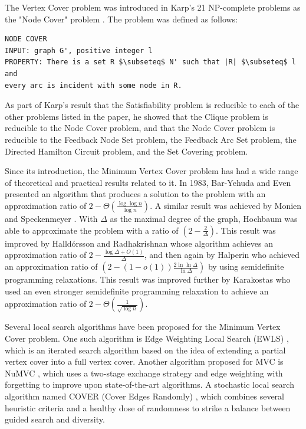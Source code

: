 \documentclass[acmlarge]{acmart}
\begin{document}

The Vertex Cover problem was introduced in Karp's 21 NP-complete problems as the "Node Cover" problem \cite{karp1972reducibility}. The problem was defined as follows:
\begin{lstlisting}
NODE COVER
INPUT: graph G', positive integer l
PROPERTY: There is a set R $\subseteq$ N' such that |R| $\subseteq$ l and
every arc is incident with some node in R.
\end{lstlisting}

As part of Karp's result that the Satisfiability problem is reducible to each of the other problems listed in the paper, he showed that the Clique problem is reducible to the Node Cover problem, and that the Node Cover problem is reducible to the Feedback Node Set problem, the Feedback Arc Set problem, the Directed Hamilton Circuit problem, and the Set Covering problem.

Since its introduction, the Minimum Vertex Cover problem has had a wide range of theoretical and practical results related to it. In 1983, Bar-Yehuda and Even \cite{bar1983local} presented an algorithm that produces a solution to the problem with an approximation ratio of $2-\Theta(\frac{\log \log n}{\log n})$. A similar result was achieved by Monien and Speckenmeyer \cite{monien1985ramsey}.  
With $\Delta$ as the maximal degree of the graph, Hochbaum \cite{hochbaum1983efficient} was able to approximate the problem with a ratio of $(2 - \frac{2}{\Delta})$. This result was improved by Halld\'{o}rsson and Radhakrishnan \cite{Hall97} whose algorithm achieves an approximation ratio of $2- \frac{\log \Delta + O(1)}{\Delta}$, and then again by Halperin \cite{halperin2002improved} who achieved an approximation ratio of $(2 - (1 - o(1)) \frac{2 \ln \ln \Delta}{\ln \Delta})$ by using semidefinite programming relaxations. This result was improved further by Karakostas \cite{karakostas2005better} who used an even stronger semidefinite programming relaxation to achieve an approximation ratio of $2 - \Theta (\frac{1}{\sqrt{\log n}})$.

Several local search algorithms have been proposed for the Minimum Vertex Cover problem. One such algorithm is Edge Weighting Local Search (EWLS) \cite{cai2010ewls}, which is an iterated search algorithm based on the idea of extending a partial vertex cover into a full vertex cover. Another algorithm proposed for MVC is NuMVC \cite{cai2013numvc}, which uses a two-stage exchange strategy and edge weighting with forgetting to improve upon state-of-the-art algorithms. A stochastic local search algorithm named COVER (Cover Edges Randomly) \cite{richter2007stochastic}, which combines several heuristic criteria and a healthy dose of randomness to strike a balance between guided search and diversity.
\end{document}
